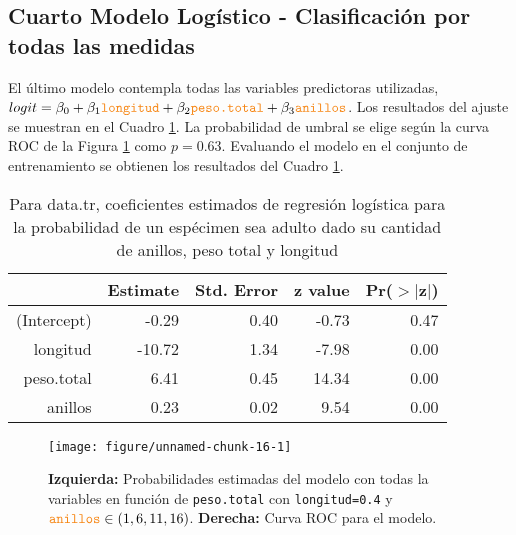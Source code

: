\documentclass[a4paper]{article}\usepackage[]{graphicx}\usepackage[]{color}
\makeatletter
\def\maxwidth{ %
  \ifdim\Gin@nat@width>\linewidth
    \linewidth
  \else
    \Gin@nat@width
  \fi
}
\newenvironment{knitrout}{}{} %
\makeatother
\begin{document}
\subsection{Cuarto Modelo Logístico - Clasificación por todas las medidas}

El último modelo contempla todas las variables predictoras utilizadas, $logit = \beta_0 + \beta_1\texttt{\textcolor{BurntOrange}{longitud}} + \beta_2 \texttt{\textcolor{BurntOrange}{peso.total}} + \beta_3 \texttt{\textcolor{BurntOrange}{anillos}}$. Los resultados del ajuste se muestran en el Cuadro \ref{tab:model4}. La probabilidad de umbral se elige según la curva ROC de la Figura \ref{fig:model4} como $p=0.63$. Evaluando el modelo en el conjunto de entrenamiento se obtienen los resultados del Cuadro \ref{tab:model4}. 

\begin{table}[ht]
\centering
\begin{tabular}{rrrrr}
  \hline
 & Estimate & Std. Error & z value & Pr($>$$|$z$|$) \\ 
  \hline
(Intercept) & -0.29 & 0.40 & -0.73 & 0.47 \\ 
  longitud & -10.72 & 1.34 & -7.98 & 0.00 \\ 
  peso.total & 6.41 & 0.45 & 14.34 & 0.00 \\ 
  anillos & 0.23 & 0.02 & 9.54 & 0.00 \\ 
   \hline
\end{tabular}
\caption{Para data.tr, coeficientes estimados de regresión logística para la probabilidad de un espécimen sea adulto dado su cantidad de anillos, peso total y longitud} 
\label{tab:model4}
\end{table}


\begin{figure}[t]
\begin{knitrout}
\color{fgcolor}

{\centering \texttt{[image: figure/unnamed-chunk-16-1]} 

}



\end{knitrout}
\caption{\textbf{Izquierda:} Probabilidades estimadas del modelo con todas la variables en función de \texttt{\textcolor{BurntOrange}{peso.total}} con \texttt{\textcolor{BurntOrange}{longitud=0.4}} y $\texttt{\textcolor{BurntOrange}{anillos}} \in (1,6,11,16)$. \textbf{Derecha:} Curva ROC para el modelo.}
\label{fig:model4}
\end{figure}
\end{document}
